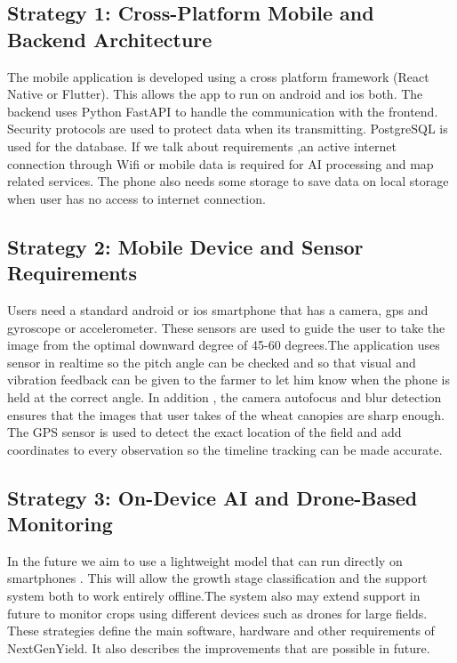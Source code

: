 \documentclass{FastFyp}
\begin{document}
\subsection{Strategy 1: Cross-Platform Mobile and Backend Architecture}

The mobile application is developed using a cross platform framework (React Native or Flutter). This allows the app to run on android and ios both. The backend uses Python FastAPI to handle the communication with the frontend. Security protocols are used to protect data when its transmitting. PostgreSQL is used for the database. If we talk about requirements ,an active internet connection through Wifi or mobile data is required for AI processing and map related services. The phone also needs some storage to save data on local storage when user has no access to internet connection.

\subsection{Strategy 2: Mobile Device and Sensor Requirements}

Users need a standard android or ios smartphone that has a camera, gps and gyroscope or accelerometer. These sensors are used to guide the user to take the image from the optimal downward degree of 45-60 degrees.The application uses sensor in realtime so the pitch angle can be checked and so that visual and vibration feedback can be given to the farmer to let him know when the phone is held at the correct angle. In addition , the camera autofocus and blur detection ensures that the images that user takes of the wheat canopies are sharp enough. The GPS sensor is used to detect the exact location of the field and add coordinates to every observation so the timeline tracking can be made accurate.

\subsection{Strategy 3: On-Device AI and Drone-Based Monitoring}

In the future we aim to use a lightweight model that can run directly on smartphones . This will allow the growth stage classification and the support system both to work entirely offline.The system also may extend support in future to monitor crops using different devices such as drones for large fields.
These strategies define the main software, hardware and other requirements of NextGenYield. It also describes the improvements that are possible in future.
\end{document}
